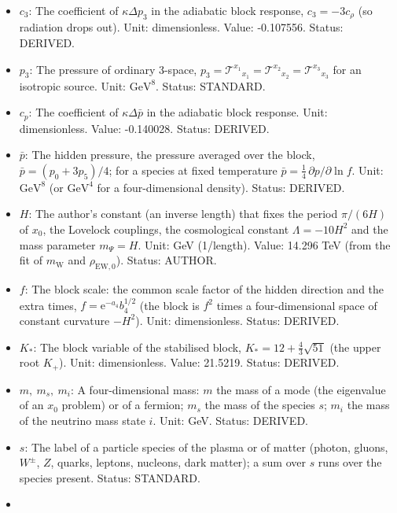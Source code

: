 \documentclass[
  10pt,
]{article}
\begin{document}
\begin{itemize}
  dimensions), \(\mathrm{GeV}^{4}\) (four dimensions). Status: STANDARD.
\item
  \(c_3\): The coefficient of \(\kappa\Delta p_3\) in the adiabatic
  block response, \(c_3 = -3c_\rho\) (so radiation drops out). Unit:
  dimensionless. Value: -0.107556. Status: DERIVED.
\item
  \(p_3\): The pressure of ordinary 3-space,
  \(p_3 = \mathcal{T}^{x_1}{}_{x_1} = \mathcal{T}^{x_2}{}_{x_2} = \mathcal{T}^{x_3}{}_{x_3}\)
  for an isotropic source. Unit: \(\mathrm{GeV}^{8}\). Status: STANDARD.
\item
  \(c_p\): The coefficient of \(\kappa\Delta\bar p\) in the adiabatic
  block response. Unit: dimensionless. Value: -0.140028. Status:
  DERIVED.
\item
  \(\bar p\): The hidden pressure, the pressure averaged over the block,
  \(\bar p = (p_0 + 3p_5)/4\); for a species at fixed temperature
  \(\bar p = \frac14\,\partial p/\partial\ln f\). Unit:
  \(\mathrm{GeV}^{8}\) (or \(\mathrm{GeV}^{4}\) for a four-dimensional
  density). Status: DERIVED.
\item
  \(H\): The author's constant (an inverse length) that fixes the period
  \(\pi/(6H)\) of \(x_0\), the Lovelock couplings, the cosmological
  constant \(\Lambda = -10H^2\) and the mass parameter \(m_\Psi = H\).
  Unit: GeV (1/length). Value: 14.296 TeV (from the fit of
  \(m_{\mathrm{W}}\) and \(\rho_{\mathrm{EW},0}\)). Status: AUTHOR.
\item
  \(f\): The block scale: the common scale factor of the hidden
  direction and the extra times, \(f = \mathrm{e}^{-a_4}b_4^{1/2}\) (the
  block is \(f^2\) times a four-dimensional space of constant curvature
  \(-H^2\)). Unit: dimensionless. Status: DERIVED.
\item
  \(K_*\): The block variable of the stabilised block,
  \(K_* = 12 + \frac43\sqrt{51}\) (the upper root \(K_+\)). Unit:
  dimensionless. Value: 21.5219. Status: DERIVED.
\item
  \(m,\ m_s,\ m_i\): A four-dimensional mass: \(m\) the mass of a mode
  (the eigenvalue of an \(x_0\) problem) or of a fermion; \(m_s\) the
  mass of the species \(s\); \(m_i\) the mass of the neutrino mass state
  \(i\). Unit: GeV. Status: DERIVED.
\item
  \(s\): The label of a particle species of the plasma or of matter
  (photon, gluons, \(W^\pm\), \(Z\), quarks, leptons, nucleons, dark
  matter); a sum over \(s\) runs over the species present. Status:
  STANDARD.
\item

\end{itemize}
\end{document}
